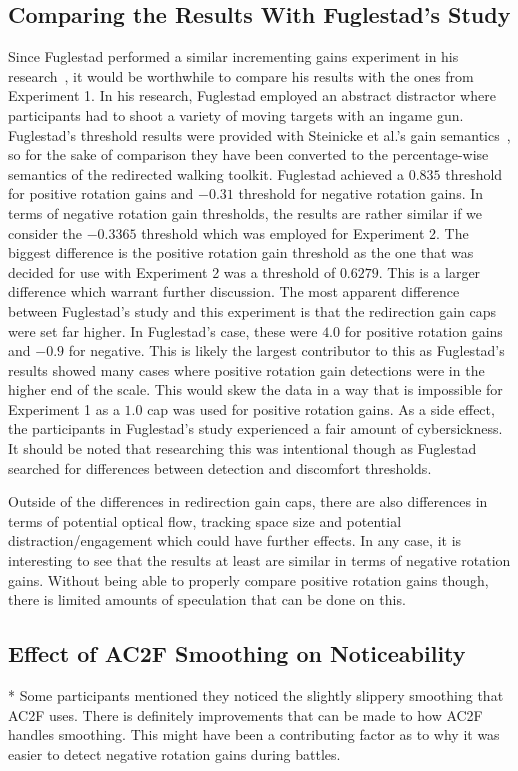 \subsection{Comparing the Results With Fuglestad's Study}
Since Fuglestad performed a similar incrementing gains experiment in his research~\cite{fuglestad2018redirected}, it would be worthwhile to compare his results with the ones from Experiment 1. In his research, Fuglestad employed an abstract distractor where participants had to shoot a variety of moving targets with an ingame gun. Fuglestad's threshold results were provided with Steinicke et al.'s gain semantics~\cite{5072212}, so for the sake of comparison they have been converted to the percentage-wise semantics of the redirected walking toolkit. Fuglestad achieved a $0.835$ threshold for positive rotation gains and $-0.31$ threshold for negative rotation gains. In terms of negative rotation gain thresholds, the results are rather similar if we consider the $-0.3365$ threshold which was employed for Experiment 2. The biggest difference is the positive rotation gain threshold as the one that was decided for use with Experiment 2 was a threshold of $0.6279$. This is a larger difference which warrant further discussion. The most apparent difference between Fuglestad's study and this experiment is that the redirection gain caps were set far higher. In Fuglestad's case, these were $4.0$ for positive rotation gains and $-0.9$ for negative. This is likely the largest contributor to this as Fuglestad's results showed many cases where positive rotation gain detections were in the higher end of the scale. This would skew the data in a way that is impossible for Experiment 1 as a $1.0$ cap was used for positive rotation gains. As a side effect, the participants in Fuglestad's study experienced a fair amount of cybersickness. It should be noted that researching this was intentional though as Fuglestad searched for differences between detection and discomfort thresholds.

Outside of the differences in redirection gain caps, there are also differences in terms of potential optical flow, tracking space size and potential distraction/engagement which could have further effects. In any case, it is interesting to see that the results at least are similar in terms of negative rotation gains. Without being able to properly compare positive rotation gains though, there is limited amounts of speculation that can be done on this. 

\subsection{Effect of AC2F Smoothing on Noticeability}
* Some participants mentioned they noticed the slightly slippery smoothing that AC2F uses. There is definitely improvements that can be made to how AC2F handles smoothing. This might have been a contributing factor as to why it was easier to detect negative rotation gains during battles. 
